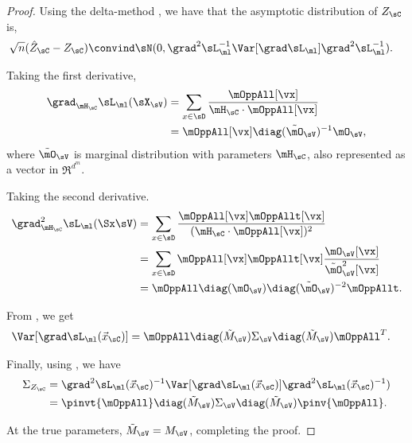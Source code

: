 \begin{proof}
  Using the delta-method \cite{vaart98asymptotic}, we have that the
  asymptotic distribution of $Z_\sC$ is,
  \begin{align*}
    \sqrt{n}(\hat Z_{\sC} - Z_{\sC}) &\convind \sN( 0, \grad^2 \sL_\ml^{-1} \Var[\grad \sL_\ml] \grad^2 \sL_\ml^{-1}).
  \end{align*}

Taking the first derivative,
\begin{align}
  \grad_{\mH_\sC} \sL_\ml(\sX_\sV) 
  &= \sum_{x \in \sD} \frac{\mOppAll[\vx]}{\mH_\sC \cdot \mOppAll[\vx]} \nonumber \\ 
  &= \mOppAll[\vx] \diag(\tilde \mO_{\sV})^{-1} \mO_{\sV}, \label{eqn:lhood-grad}
\end{align}
where $\tilde \mO_\sV$ is marginal distribution with parameters $\mH_\sC$, also represented as a vector in $\Re^{d^m}$.

Taking the second derivative.
\begin{align}
  \grad^2_{\mH_\sC} \sL_\ml(\Sx \sV) 
  &= \sum_{x \in \sD} \frac{\mOppAll[\vx] \mOppAllt[\vx]}{(\mH_\sC \cdot \mOppAll[\vx])^2} \nonumber \\
  &= \sum_{x \in \sD}\mOppAll[\vx] \mOppAllt[\vx] \frac{\mO_{\sV}[\vx]}{\tilde \mO_{\sV}^2[\vx]} \nonumber \\
  &= \mOppAll \diag(\mO_{\sV}) \diag(\tilde \mO_{\sV})^{-2} \mOppAllt. \label{eqn:lhood-hess}%
\end{align}



  From , we get
  \begin{align*}
    \Var [\grad \sL_\ml(\vec x_\sC)] &= \mOppAll \diag(\tilde M_\sV) \Sigma_\sV \diag(\tilde M_\sV) \mOppAll^T .
  \end{align*}

  Finally, using , we have
  \begin{align*}
    \Sigma_{Z_\sC} 
      &= \grad^2 \sL_\ml(\vec x_\sC)^{-1} \Var [\grad \sL_\ml(\vec x_\sC)] \grad^2 \sL_\ml(\vec x_\sC)^{-1}) \\
      &= \pinvt{\mOppAll} \diag(\tilde M_\sV) \Sigma_\sV \diag(\tilde M_\sV) \pinv{\mOppAll}.
  \end{align*}

  At the true parameters, $\tilde M_\sV = M_\sV$, completing the proof.
\end{proof}

